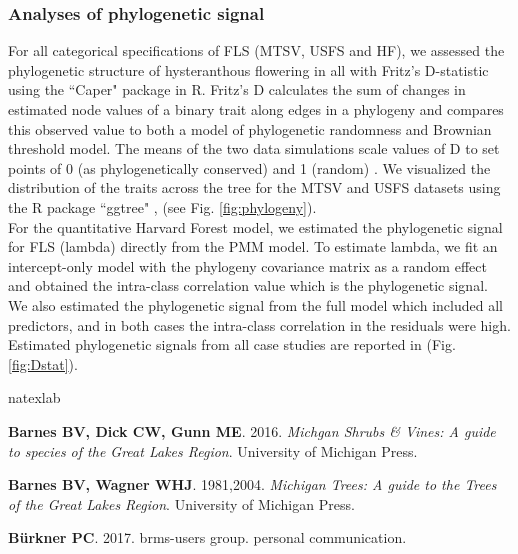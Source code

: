 \documentclass[11pt]{article}\usepackage[]{graphicx}\usepackage[]{color}
\begin{document}
{\subsubsection*{Analyses of phylogenetic signal}
For all categorical specifications of FLS (MTSV, USFS and HF), we assessed the phylogenetic structure of hysteranthous flowering in all  with Fritz's D-statistic \citep{FRITZ2010} using the ``Caper" package \citep{Orme2013} in R. Fritz's D calculates the sum of changes in estimated node values of a binary trait along edges in a phylogeny and compares this observed value to both a model of phylogenetic randomness and Brownian threshold model. The means of the two data simulations scale values of D to set points of 0 (as phylogenetically conserved) and 1 (random)  \citep{Orme2013}. We visualized the distribution of the traits across the tree for the MTSV and USFS datasets using the R package ``ggtree" \citep{Yu2017}, (see Fig. \ref{fig:phylogeny}).\\

\noindent For the quantitative Harvard Forest model, we estimated the phylogenetic signal for FLS (lambda) directly from the PMM model. To estimate lambda, we fit an intercept-only model with the phylogeny covariance matrix as a random effect and obtained the intra-class correlation value which is the phylogenetic signal. We also estimated the phylogenetic signal from the full model which included all predictors, and in both cases the intra-class correlation in the residuals were high. Estimated phylogenetic signals from all case studies are reported in (Fig. \ref{fig:Dstat}).  %
  
  
\clearpage

%
\begin{thebibliography}{20}
\expandafter\ifx\csname natexlab\endcsname\relax\def\natexlab#1{#1}\fi

{\bf Barnes BV, Dick CW, Gunn ME}. 2016.
\newblock \emph{Michgan Shrubs & Vines: A guide to species of the Great Lakes
  Region}.
\newblock University of Michigan Press.

{\bf Barnes BV, Wagner WHJ}. 1981,2004.
\newblock \emph{Michigan Trees: A guide to the Trees of the Great Lakes
  Region}.
\newblock University of Michigan Press.

{\bf B{\"u}rkner PC}. 2017.
\newblock brms-users group.
\newblock personal communication.


\end{thebibliography}}
\end{document}
